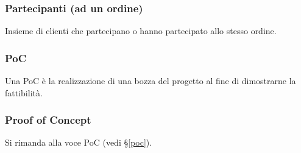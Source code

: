 
\subsubsection*{Partecipanti (ad un ordine)}
Insieme di clienti che partecipano o hanno partecipato allo stesso ordine.

\subsubsection*{PoC}
\label{poc}
Una PoC è la realizzazione di una bozza del progetto al fine di dimostrarne la fattibilità.

\subsubsection*{Proof of Concept}
Si rimanda alla voce PoC (vedi \S\ref{poc}).

\newpage

